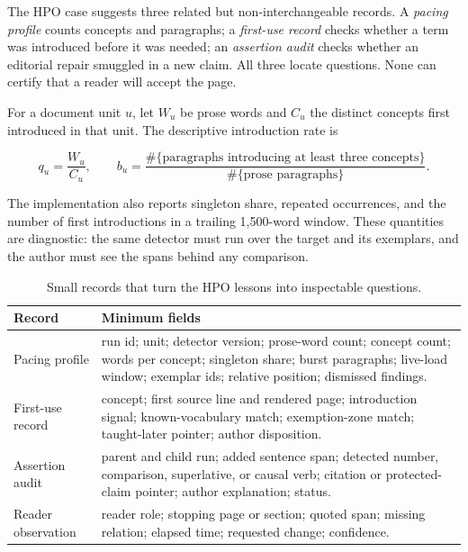The HPO case suggests three related but non-interchangeable records. A
\emph{pacing profile} counts concepts and paragraphs; a \emph{first-use
record} checks whether a term was introduced before it was needed; an
\emph{assertion audit} checks whether an editorial repair smuggled in a new
claim. All three locate questions. None can certify that a reader will accept
the page.

For a document unit $u$, let $W_u$ be prose words and $C_u$ the distinct
concepts first introduced in that unit. The descriptive introduction rate is

\begin{equation}
  q_u=\frac{W_u}{C_u},
  \qquad
  b_u=\frac{\#\{\text{paragraphs introducing at least three concepts}\}}
                 {\#\{\text{prose paragraphs}\}}.
  \label{eq:pacing-profile}
\end{equation}

The implementation also reports singleton share, repeated occurrences, and
the number of first introductions in a trailing 1,500-word window. These
quantities are diagnostic: the same detector must run over the target and its
exemplars, and the author must see the spans behind any comparison.

\begin{table}[H]
\centering
\small
\begin{tabularx}{\textwidth}{@{}p{}L@{}}
\toprule
Record & Minimum fields \\
\midrule
Pacing profile & run id; unit; detector version; prose-word count; concept
count; words per concept; singleton share; burst paragraphs; live-load
window; exemplar ids; relative position; dismissed findings. \\
First-use record & concept; first source line and rendered page; introduction
signal; known-vocabulary match; exemption-zone match; taught-later pointer;
author disposition. \\
Assertion audit & parent and child run; added sentence span; detected number,
comparison, superlative, or causal verb; citation or protected-claim pointer;
author explanation; status. \\
Reader observation & reader role; stopping page or section; quoted span;
missing relation; elapsed time; requested change; confidence. \\
\bottomrule
\end{tabularx}
\caption{Small records that turn the HPO lessons into inspectable questions.}
\label{tab:pacing-order-assertion-records}
\end{table}

